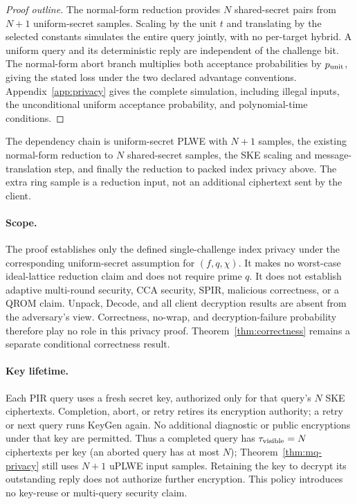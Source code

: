 \begin{proof}[Proof outline]
The normal-form reduction provides \(N\) shared-secret pairs from
\(N+1\) uniform-secret samples. Scaling by the unit \(t\) and translating
by the selected constants simulates the entire query jointly, with no
per-target hybrid. A uniform query and its deterministic reply are
independent of the challenge bit. The normal-form abort branch multiplies
both acceptance probabilities by \(p_{\rm unit}\), giving the stated
loss under the two declared advantage conventions. Appendix~\ref{app:privacy}
gives the complete simulation, including illegal inputs, the unconditional
uniform acceptance probability, and polynomial-time conditions.
\end{proof}


The dependency chain is uniform-secret PLWE with \(N+1\) samples,
the existing normal-form reduction to \(N\) shared-secret samples,
the SKE scaling and message-translation step, and finally the reduction
to packed index privacy above. The extra ring sample is a reduction
input, not an additional ciphertext sent by the client.

\paragraph{Scope.}
The proof establishes only the defined single-challenge index privacy under
the corresponding uniform-secret assumption for \((f,q,\chi)\).
It makes no worst-case ideal-lattice reduction claim and does not require
prime \(q\). It does not establish adaptive
multi-round security, CCA security, SPIR, malicious correctness, or a QROM
claim. Unpack, Decode, and all client decryption results are absent from
the adversary's view. Correctness, no-wrap, and decryption-failure probability
therefore play no role in this privacy proof. Theorem~\ref{thm:correctness}
remains a separate conditional correctness result.

\paragraph{Key lifetime.}
Each PIR query uses a fresh secret key, authorized only for that query's
\(N\) SKE ciphertexts. Completion, abort, or retry retires its encryption
authority; a retry or next query runs KeyGen again. No additional diagnostic
or public encryptions under that key are permitted. Thus a completed query
has \(\tau_{\rm visible}=N\) ciphertexts per key (an aborted query has at most
\(N\)); Theorem~\ref{thm:mq-privacy} still uses \(N+1\) uPLWE input samples.
Retaining the key to decrypt its outstanding reply does not authorize
further encryption. This policy introduces no key-reuse or multi-query
security claim.
